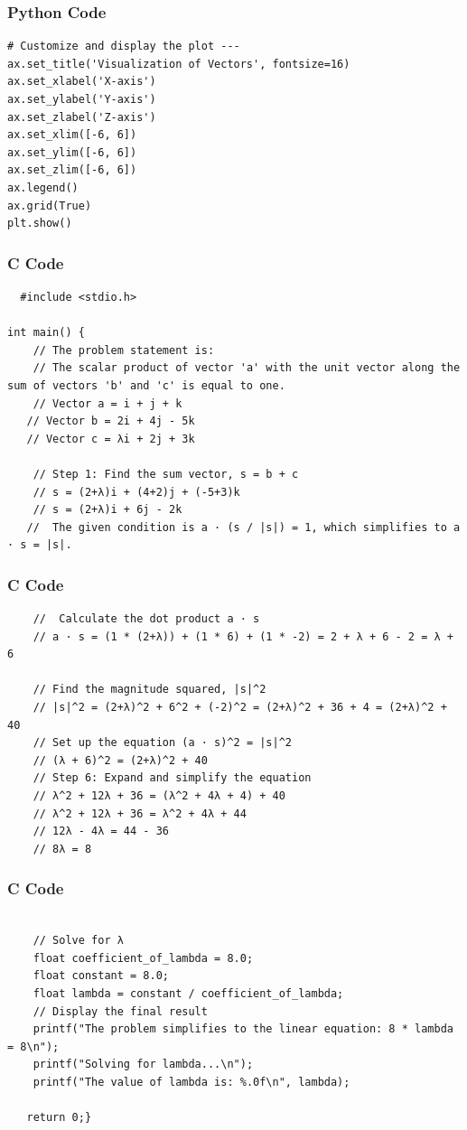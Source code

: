 \documentclass{beamer}
\begin{document}
 
\begin{frame}[fragile]
    \frametitle{Python Code}

    \begin{lstlisting}
# Customize and display the plot ---
ax.set_title('Visualization of Vectors', fontsize=16)
ax.set_xlabel('X-axis')
ax.set_ylabel('Y-axis')
ax.set_zlabel('Z-axis')
ax.set_xlim([-6, 6])
ax.set_ylim([-6, 6])
ax.set_zlim([-6, 6])
ax.legend()
ax.grid(True)
plt.show()
\end{lstlisting}
\end{frame}

\begin{frame}[fragile]
\frametitle{C Code}
\begin{lstlisting}
  #include <stdio.h>

int main() {
    // The problem statement is:
    // The scalar product of vector 'a' with the unit vector along the sum of vectors 'b' and 'c' is equal to one.
    // Vector a = i + j + k
   // Vector b = 2i + 4j - 5k
   // Vector c = λi + 2j + 3k

    // Step 1: Find the sum vector, s = b + c
    // s = (2+λ)i + (4+2)j + (-5+3)k
    // s = (2+λ)i + 6j - 2k
   //  The given condition is a · (s / |s|) = 1, which simplifies to a · s = |s|.
\end{lstlisting}

\end{frame}
\begin{frame}[fragile]
\frametitle{C Code}
\begin{lstlisting}
    //  Calculate the dot product a · s
    // a · s = (1 * (2+λ)) + (1 * 6) + (1 * -2) = 2 + λ + 6 - 2 = λ + 6

    // Find the magnitude squared, |s|^2
    // |s|^2 = (2+λ)^2 + 6^2 + (-2)^2 = (2+λ)^2 + 36 + 4 = (2+λ)^2 + 40
    // Set up the equation (a · s)^2 = |s|^2
    // (λ + 6)^2 = (2+λ)^2 + 40
    // Step 6: Expand and simplify the equation
    // λ^2 + 12λ + 36 = (λ^2 + 4λ + 4) + 40
    // λ^2 + 12λ + 36 = λ^2 + 4λ + 44
    // 12λ - 4λ = 44 - 36
    // 8λ = 8
\end{lstlisting}
\end{frame}
\begin{frame}[fragile]
\frametitle{C Code}
\begin{lstlisting}

    // Solve for λ
    float coefficient_of_lambda = 8.0;
    float constant = 8.0;
    float lambda = constant / coefficient_of_lambda;
    // Display the final result
    printf("The problem simplifies to the linear equation: 8 * lambda = 8\n");
    printf("Solving for lambda...\n");
    printf("The value of lambda is: %.0f\n", lambda);

   return 0;}
\end{lstlisting}

\end{frame}
\end{document}
